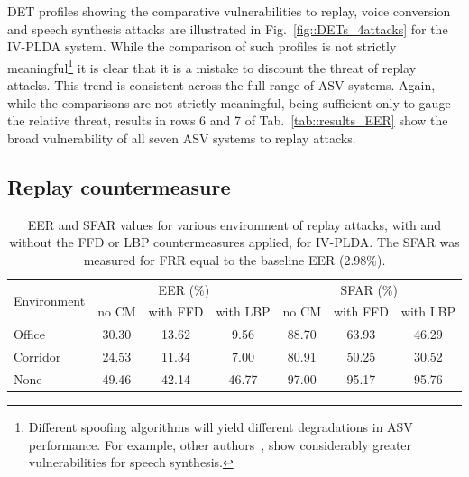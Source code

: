 DET profiles showing the comparative vulnerabilities to replay, voice conversion and speech synthesis attacks are illustrated in Fig.~\ref{fig::DETs_4attacks} for the IV-PLDA system.  While the comparison of such profiles is not strictly meaningful\footnote{Different spoofing algorithms will yield different degradations in ASV performance.  For example, other authors~\cite{DeLeon2012}, show considerably greater vulnerabilities for speech synthesis.} it is clear that it is a mistake to discount the threat of replay attacks.  This trend is consistent across the full range of ASV systems.  Again, while the comparisons are not strictly meaningful, being sufficient only to gauge the relative threat, results in rows 6 and 7 of Tab.~\ref{tab::results_EER} show the broad vulnerability of all seven ASV systems to replay attacks.





\subsection{Replay countermeasure}


\begin{table}
\renewcommand{\arraystretch}{1.2}
\begin{center}
    \begin{tabular}{ l || c c c | c c c}
    \hline
 \multirow{2}{*}{Environment}  & \multicolumn{3}{c|}{EER (\%)} & \multicolumn{3}{c}{SFAR (\%)} \\
     	 & no CM & with FFD & with LBP & no CM & with FFD & with LBP\\ 

 \hline \hline
Office   & 30.30 & 13.62 & 9.56 & 88.70 & 63.93 & 46.29\\
Corridor & 24.53 & 11.34 & 7.00 & 80.91 & 50.25 & 30.52\\
None & 49.46 & 42.14 & 46.77 & 97.00 & 95.17 & 95.76\\
\hline
    \end{tabular}
    \caption{EER and SFAR values for various environment of replay attacks, with and without the FFD or LBP countermeasures applied, for IV-PLDA. The SFAR was measured for FRR equal to the baseline EER (2.98\%).}
		\label{tab::results_CM_rooms}
   \end{center}
\end{table}


